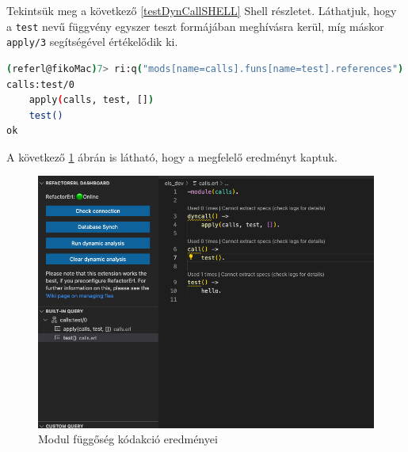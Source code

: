 Tekintsük meg a következő \ref{testDynCallSHELL} Shell részletet. Láthatjuk, hogy a \lstinline{test} nevű függvény egyszer teszt formájában meghívásra kerül, míg máskor \lstinline{apply/3} segítségével értékelődik ki.


\lstset{caption=Függvény dinamikus hívásainak lekérdezésének eredménye, label=src:sh} \label{testDynCallSHELL}
\begin{lstlisting}[language={sh}]  
(referl@fikoMac)7> ri:q("mods[name=calls].funs[name=test].references").
calls:test/0
    apply(calls, test, [])
    test()
ok
\end{lstlisting}

A következő \ref{fig:dynCall} ábrán is látható, hogy a megfelelő eredményt kaptuk.

\begin{figure}[H]
  \centering
  \includegraphics[width=0.8\linewidth]{images/testCases/dynCall.png}
  \caption{Modul függőség kódakció eredményei}
  \label{fig:dynCall}
\end{figure}


